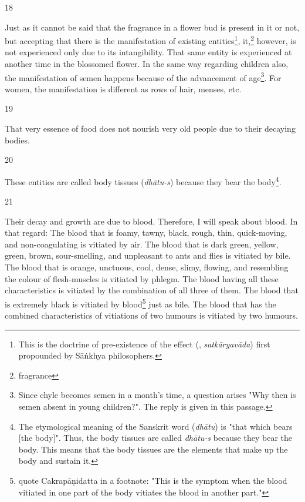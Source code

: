 \begin{translation}
\item[18]

Just as it cannot be said that the fragrance in a flower bud is present in it or not, but 
accepting that there is the manifestation of existing entities\footnote{This is the 
doctrine of pre-existence of the effect (, \textit{satkāryavāda}) 
first propounded by Sāṅkhya philosophers.}, it,\footnote{fragrance} however, is not 
experienced only due to its intangibility. That same entity is experienced at another 
time in the blossomed flower. In the same way regarding children also, the 
manifestation of semen happens because of the advancement of 
age\footnote{Since chyle becomes semen in a month's time, a question arises "Why 
then is semen absent in young children?". The reply is given in this passage.}. For 
women, the manifestation is different as rows of hair, menses, etc. 

\item[19]

That very essence of food does not nourish very old people due to their decaying bodies.

\item[20]

These entities are called body tissues (\emph{dhātu-s}) because they bear the body\footnote{The etymological meaning of the Sanskrit word  (\emph{dhātu}) is "that which bears [the body]". Thus, the body tissues are called \emph{dhātu-s} because they bear the body. This means that the body tissues are the elements that make up the body and sustain it.}. 

\item[21]

Their decay and growth are due to blood. Therefore, I will speak about blood. 
In that regard: The blood that is foamy, tawny, black, rough, thin, quick-moving, and non-coagulating is vitiated by air. The blood that is dark green, yellow, green, brown, sour-smelling, and unpleasant to ants and flies is vitiated by bile. The blood that is orange, unctuous, cool, dense, slimy, flowing, and resembling the colour of flesh-muscles is vitiated by phlegm. The blood having all these characteristics is vitiated by the combination of all three of them. The blood that is extremely black is vitiated by blood\footnote{\citet[64]{vulgate} quote Cakrapāṇidatta in a footnote: "This is the symptom when the blood vitiated in one part of the body vitiates the blood in another part."} just as bile. The blood that has the combined characteristics of vitiations of two humours is vitiated by two humours.


\end{translation}
